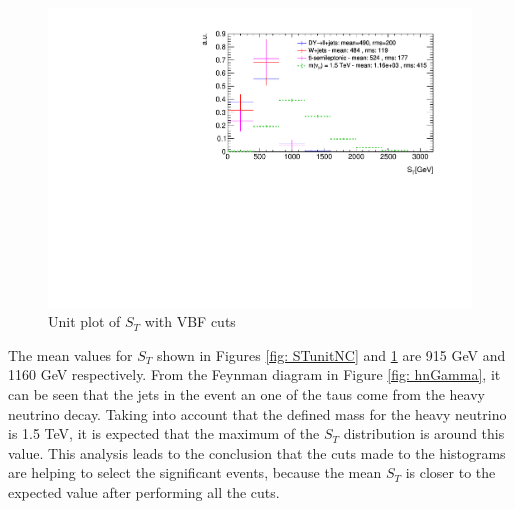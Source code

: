 \begin{figure}
\centering
\includegraphics[width=\linewidth]{Figures/Plots/ST_unitVBF.pdf}
\caption{Unit plot of $S_{T}$ with VBF cuts}
\label{fig: STunitVBF}
\end{figure}

The mean values for $S_{T}$ shown in Figures \ref{fig: STunitNC} and \ref{fig: STunitVBF} are 915 GeV and 1160 GeV respectively. From the Feynman diagram in Figure \ref{fig: hnGamma}, it can be seen that the jets in the event an one of the taus come from the heavy neutrino decay. Taking into account that the defined mass for the heavy neutrino is 1.5 TeV, it is expected that the maximum of the $S_{T}$ distribution is around this value. This analysis leads to the conclusion that the cuts made to the histograms are helping to select the significant events, because the mean $S_{T}$ is closer to the expected value after performing all the cuts.





